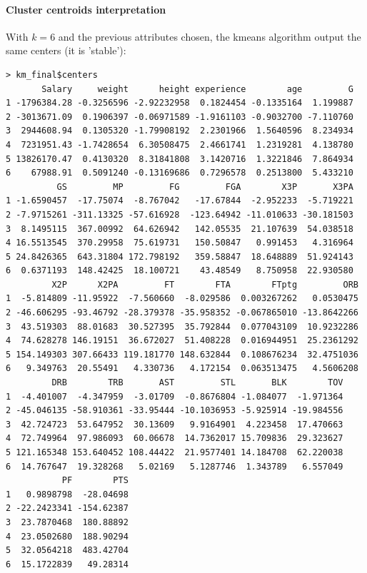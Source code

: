 \paragraph{Cluster centroids interpretation}With $k=6$ and the previous attributes chosen, the kmeans algorithm output the same centers (it is 'stable'):

\begin{verbatim}
> km_final$centers
       Salary     weight      height experience        age         G
1 -1796384.28 -0.3256596 -2.92232958  0.1824454 -0.1335164  1.199887
2 -3013671.09  0.1906397 -0.06971589 -1.9161103 -0.9032700 -7.110760
3  2944608.94  0.1305320 -1.79908192  2.2301966  1.5640596  8.234934  
4  7231951.43 -1.7428654  6.30508475  2.4661741  1.2319281  4.138780 
5 13826170.47  0.4130320  8.31841808  3.1420716  1.3221846  7.864934 
6    67988.91  0.5091240 -0.13169686  0.7296578  0.2513800  5.433210  
          GS         MP         FG         FGA        X3P       X3PA
1 -1.6590457  -17.75074  -8.767042   -17.67844  -2.952233  -5.719221
2 -7.9715261 -311.13325 -57.616928  -123.64942 -11.010633 -30.181503
3  8.1495115  367.00992  64.626942   142.05535  21.107639  54.038518
4 16.5513545  370.29958  75.619731   150.50847   0.991453   4.316964
5 24.8426365  643.31804 172.798192   359.58847  18.648889  51.924143
6  0.6371193  148.42425  18.100721    43.48549   8.750958  22.930580
         X2P      X2PA         FT        FTA        FTptg         ORB
1  -5.814809 -11.95922  -7.560660  -8.029586  0.003267262   0.0530475
2 -46.606295 -93.46792 -28.379378 -35.958352 -0.067865010 -13.8642266
3  43.519303  88.01683  30.527395  35.792844  0.077043109  10.9232286
4  74.628278 146.19151  36.672027  51.408228  0.016944951  25.2361292
5 154.149303 307.66433 119.181770 148.632844  0.108676234  32.4751036
6   9.349763  20.55491   4.330736   4.172154  0.063513475   4.5606208
         DRB        TRB       AST         STL       BLK        TOV
1  -4.401007  -4.347959  -3.01709  -0.8676804 -1.084077  -1.971364 
2 -45.046135 -58.910361 -33.95444 -10.1036953 -5.925914 -19.984556
3  42.724723  53.647952  30.13609   9.9164901  4.223458  17.470663  
4  72.749964  97.986093  60.06678  14.7362017 15.709836  29.323627  
5 121.165348 153.640452 108.44422  21.9577401 14.184708  62.220038  
6  14.767647  19.328268   5.02169   5.1287746  1.343789   6.557049  
           PF        PTS
1   0.9898798  -28.04698
2 -22.2423341 -154.62387
3  23.7870468  180.88892
4  23.0502680  188.90294
5  32.0564218  483.42704
6  15.1722839   49.28314
\end{verbatim}
